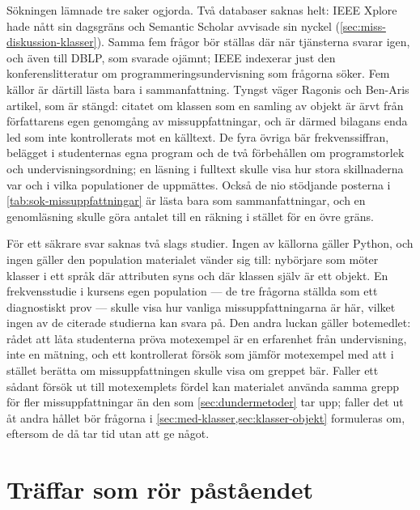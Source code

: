 Sökningen lämnade tre saker ogjorda.  Två databaser saknas helt: IEEE
Xplore hade nått sin dagsgräns och Semantic Scholar avvisade sin nyckel
(\cref{sec:miss-diskussion-klasser}).  Samma fem frågor bör ställas där när
tjänsterna svarar igen, och även till DBLP, som svarade ojämnt; IEEE
indexerar just den konferenslitteratur om programmeringsundervisning som
frågorna söker.  Fem källor är därtill lästa bara i sammanfattning.
Tyngst väger Ragonis och Ben-Aris artikel\autocite{Ragonis2005OOP}, som
är stängd: citatet om klassen som en samling av objekt är ärvt från
författarens egen genomgång av missuppfattningar, och är därmed
bilagans enda led som inte kontrollerats mot en källtext.  De fyra
övriga\autocite{Xinogalos2015,SandersThomas2007,Wiedenbeck1999,%
KunkleAllen2016} bär frekvenssiffran, belägget i studenternas egna
program och de två förbehållen om programstorlek och
undervisningsordning; en läsning i fulltext skulle visa hur stora
skillnaderna var och i vilka populationer de uppmättes.  Också de nio
stödjande posterna i \cref{tab:sok-missuppfattningar} är lästa bara som
sammanfattningar, och en genomläsning skulle göra antalet till en
räkning i stället för en övre gräns.

För ett säkrare svar saknas två slags studier.  Ingen av källorna gäller
Python, och ingen gäller den population materialet vänder sig till:
nybörjare som möter klasser i ett språk där attributen syns och där
klassen själv är ett objekt.  En frekvensstudie i kursens egen
population --- de tre frågorna ställda som ett diagnostiskt prov ---
skulle visa hur vanliga missuppfattningarna är här, vilket ingen av de
citerade studierna kan svara på.  Den andra luckan gäller botemedlet:
rådet att låta studenterna pröva motexempel\autocite{Holland1997} är en
erfarenhet från undervisning, inte en mätning, och ett kontrollerat
försök som jämför motexempel med att i stället berätta om
missuppfattningen skulle visa om greppet bär.  Faller ett sådant försök
ut till motexemplets fördel kan materialet använda samma grepp för fler
missuppfattningar än den som \cref{sec:dundermetoder} tar upp; faller
det ut åt andra hållet bör frågorna i
\cref{sec:med-klasser,sec:klasser-objekt} formuleras om, eftersom de då
tar tid utan att ge något.

\section{Träffar som rör påståendet}
\label{sec:miss-traffar}

